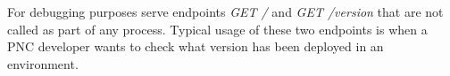 \documentclass[../main.tex]{subfiles}
\begin{document}
For debugging purposes serve endpoints \textit{GET /} and \textit{GET /version} that are not called as part of any process. Typical usage of these two endpoints is when a PNC developer wants to check what version has been deployed in an environment.
\end{document}
